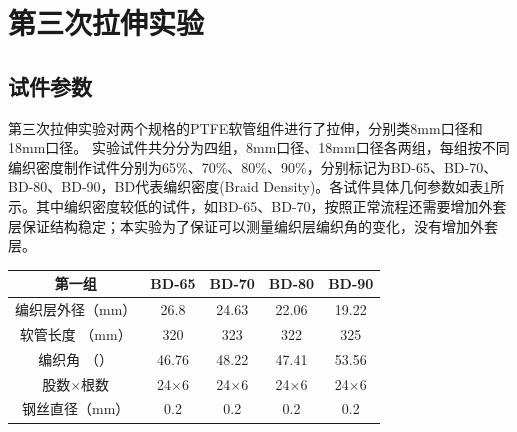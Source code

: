 \newpage
\section{第三次拉伸实验}
\subsection{试件参数}
  第三次拉伸实验对两个规格的PTFE软管组件进行了拉伸，分别类8mm口径和18mm口径。
  实验试件共分分为四组，8mm口径、18mm口径各两组，每组按不同编织密度制作试件分别为65\%、70\%、80\%、90\%，分别标记为BD-65、BD-70、BD-80、BD-90，BD代表编织密度(Braid Density)。各试件具体几何参数如表\ref{tab:hose-specimen-III-1}所示。其中编织密度较低的试件，如BD-65、BD-70，按照正常流程还需要增加外套层保证结构稳定；本实验为了保证可以测量编织层编织角的变化，没有增加外套层。
  
  
  
  \begin{table}[!htb]
  	\centering
  	\label{tab:hose-specimen-III-1}
  	\begin{tabular*}{0.8\textwidth}{@{\extracolsep{\fill}}>{\hspace{0.5cm}}ccccc}
  		\toprule
  		\textbf{第一组}&     BD-65     &     BD-70     &     BD-80     &     BD-90     \\ \midrule
  		编织层外径（mm）  & 26.8         &     24.63     &     22.06     &     19.22       \\
  		软管长度 （mm）    & 320          &      323      &      322      &      325       \\
  		编织角 （\textdegree）   & 46.76 &     48.22     &     47.41     &     53.56     \\
  		股数$ \times $根数          & 24$ \times $6 & 24$ \times $6 & 24$ \times $6 & 24$ \times $6 \\
  		钢丝直径（mm）                &      0.2      &      0.2      &      0.2      &      0.2      \\ \bottomrule
  	\end{tabular*} 
  \end{table}
  
